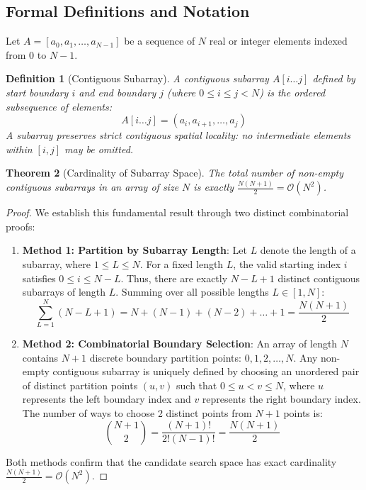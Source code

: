 \documentclass[10pt,journal,compsoc,onecolumn]{IEEEtran}
\newtheorem{theorem}{Theorem}
\newtheorem{definition}[theorem]{Definition}
\begin{document}
\subsection{Formal Definitions and Notation}

Let $A = [a_0, a_1, \dots, a_{N-1}]$ be a sequence of $N$ real or integer elements indexed from $0$ to $N-1$.

\begin{definition}[Contiguous Subarray]
A contiguous subarray $A[i \dots j]$ defined by start boundary $i$ and end boundary $j$ (where $0 \le i \le j < N$) is the ordered subsequence of elements:
\begin{equation}
A[i \dots j] = (a_i, a_{i+1}, \dots, a_j)
\end{equation}
A subarray preserves strict contiguous spatial locality: no intermediate elements within $[i, j]$ may be omitted.
\end{definition}

\begin{theorem}[Cardinality of Subarray Space]
The total number of non-empty contiguous subarrays in an array of size $N$ is exactly $\frac{N(N+1)}{2} = \mathcal{O}(N^2)$.
\end{theorem}
\begin{proof}
We establish this fundamental result through two distinct combinatorial proofs:
\begin{enumerate}
    \item \textbf{Method 1: Partition by Subarray Length}: 
    Let $L$ denote the length of a subarray, where $1 \le L \le N$. For a fixed length $L$, the valid starting index $i$ satisfies $0 \le i \le N - L$. Thus, there are exactly $N - L + 1$ distinct contiguous subarrays of length $L$. Summing over all possible lengths $L \in [1, N]$:
    \begin{equation}
    \sum_{L=1}^{N} (N - L + 1) = N + (N-1) + (N-2) + \dots + 1 = \frac{N(N+1)}{2}
    \end{equation}
    \item \textbf{Method 2: Combinatorial Boundary Selection}:
    An array of length $N$ contains $N+1$ discrete boundary partition points: $0, 1, 2, \dots, N$. Any non-empty contiguous subarray is uniquely defined by choosing an unordered pair of distinct partition points $(u, v)$ such that $0 \le u < v \le N$, where $u$ represents the left boundary index and $v$ represents the right boundary index. The number of ways to choose 2 distinct points from $N+1$ points is:
    \begin{equation}
    \binom{N+1}{2} = \frac{(N+1)!}{2! (N-1)!} = \frac{N(N+1)}{2}
    \end{equation}
\end{enumerate}
Both methods confirm that the candidate search space has exact cardinality $\frac{N(N+1)}{2} = \mathcal{O}(N^2)$.
\end{proof}
\end{document}

